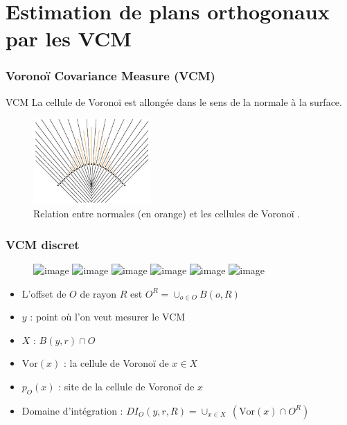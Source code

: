 \documentclass{beamer}
\begin{document}
\section{Estimation de plans orthogonaux par les VCM}
\begin{frame}
	\frametitle{Voronoï Covariance Measure (VCM)}
			
	\begin{block}{VCM\footnotemark}
			La cellule de Voronoï est allongée
			dans le sens de la normale à la surface.
	\end{block}
			
	\begin{figure}																
				\centering
				\includegraphics[width=0.4\textwidth]{fig/continuousvoronoi.png}
		\caption{Relation entre normales (en orange) et les cellules de Voronoï .}
	\end{figure}
	\vspace{-0.3cm}
			
\end{frame}

\begin{frame}
	\frametitle{VCM discret}
	\vspace{-0.5cm}
		\begin{figure}
		\includegraphics<1>[scale=0.33]{fig/dvcm-r6.png}
		\includegraphics<2>[scale=0.33]{fig/dvcm-r5.png}
		\includegraphics<3>[scale=0.33]{fig/dvcm-r4.png}
		\includegraphics<4>[scale=0.33]{fig/dvcm-r3.png}
		\includegraphics<5>[scale=0.33]{fig/dvcm-r8.png}
		\includegraphics<6>[scale=0.33]{fig/dvcm-r7.png}
	\end{figure}
	\vspace{-0.6cm}
	\begin{itemize}
		\item<2,3,4,5,6> L'offset de $O$ de rayon $R$ est $O^R=\cup_{o \in O} B(o, R)$ 
		\item<3,4,5,6> $y$ : point où l'on veut mesurer le VCM
		\item<4,5,6> $X$ : $B(y,r) \cap O$
		\item<5,6> $\text{Vor}(x)$ : la cellule de Voronoï de $x \in X$ 
		\item<5,6> $p_O(x)$ : site de la cellule de Voronoï de $x$
		\item<6> Domaine d'intégration : $DI_O(y, r, R) = \cup_{x \in X}\ (\text{Vor}(x) \cap O^R)$
	\end{itemize}
					

			
\end{frame}
\end{document}
